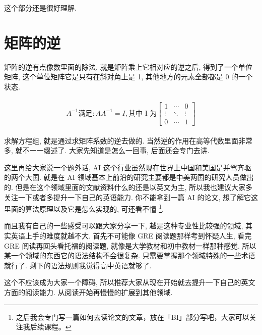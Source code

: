 这个部分还是很好理解. 

\section{矩阵的逆}

矩阵的逆有点像数里面的除法, 就是矩阵乘上它相对应的逆之后, 得到了一个单位矩阵, 这个单位矩阵它是只有在斜对角上是 1, 其他地方的元素全部都是 0 的一个状态. 

\begin{align*}
  \begin{split}
    A^{-1}\mbox{满足}:AA^{-1}=I, \mbox{其中 I 为}
    \begin{bmatrix} 1 & \cdots & 0 \\ \vdots & \ddots &\vdots \\ 0 & \cdots & 1 \end{bmatrix}
  \end{split}
\end{align*}

求解方程组, 就是通过求矩阵系数的逆去做的. 当然逆的作用在高等代数里面非常多, 就不一一缀述了. 大家先知道是怎么一回事, 后面还会专门去讲. 

这里再给大家说一个题外话, AI 这个行业虽然现在世界上中国和美国是并驾齐驱的两个大国. 就是在 AI 领域基本上前沿的研究主要都是中美两国的研究人员做出的. 但是在这个领域里面的文献资料什么的还是以英文为主, 所以我也建议大家多关注一下或者多提升一下自己的英语能力. 你不能拿到一篇 AI 的论文, 想了解它这里面的算法原理以及它是怎么实现的, 可还看不懂 \footnote{之后我会专门写一篇如何去读论文的文章，放在「BI」部分写吧，大家可以关注我后续课程。}. 

而且我有自己的一些感受可以跟大家分享一下, 越是这种专业性比较强的领域, 其实英语上手的难度就越不大. 首先不可能像 GRE 阅读题那样考到怀疑人生, 看完 GRE 阅读再回头看托福的阅读题, 就像是大学教材和初中教材一样那种感觉. 所以某一个领域的东西它的语法结构不会很复杂. 只需要掌握那个领域特殊的一些术语就行了. 剩下的语法规则我觉得高中英语就够了. 

这个不应该成为大家一个障碍, 所以推荐大家从现在开始就去提升一下自己的英文方面的阅读能力. 从阅读开始再慢慢的扩展到其他领域. 